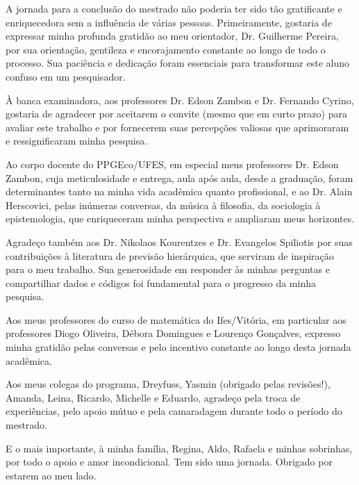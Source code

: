\begin{agradecimentos}
  A jornada para a conclusão do mestrado não poderia ter sido tão gratificante e enriquecedora sem a influência de várias pessoas. Primeiramente, gostaria de expressar minha profunda gratidão ao meu orientador, Dr. Guilherme Pereira, por sua orientação, gentileza e encorajamento constante ao longo de todo o processo. Sua paciência e dedicação foram essenciais para transformar este aluno confuso em um pesquisador.

  À banca examinadora, aos professores Dr. Edson Zambon e Dr. Fernando Cyrino, gostaria de agradecer por aceitarem o convite (mesmo que em curto prazo) para avaliar este trabalho e por fornecerem suas percepções valiosas que aprimoraram e ressignificaram minha pesquisa.

  Ao corpo docente do PPGEco/UFES, em especial meus professores Dr. Edson Zambon, cuja meticulosidade e entrega, aula após aula, desde a graduação, foram determinantes tanto na minha vida acadêmica quanto profissional, e ao Dr. Alain Herscovici, pelas inúmeras conversas, da música à filosofia, da sociologia à epistemologia, que enriqueceram minha perspectiva e ampliaram meus horizontes.

  Agradeço também aos Dr. Nikolaos Kourentzes e Dr. Evangelos Spiliotis por suas contribuições à literatura de previsão hierárquica, que serviram de inspiração para o meu trabalho. Sua generosidade em responder às minhas perguntas e compartilhar dados e códigos foi fundamental para o progresso da minha pesquisa.

  Aos meus professores do curso de matemática do Ifes/Vitória, em particular aos professores Diogo Oliveira, Débora Domingues e Lourenço Gonçalves, expresso minha gratidão pelas conversas e pelo incentivo constante ao longo desta jornada acadêmica.

  Aos meus colegas do programa, Dreyfuss, Yasmin (obrigado pelas revisões!), Amanda, Leina, Ricardo, Michelle e Eduardo, agradeço pela troca de experiências, pelo apoio mútuo e pela camaradagem durante todo o período do mestrado.

  E o mais importante, à minha família, Regina, Aldo, Rafaela e minhas sobrinhas, por todo o apoio e amor incondicional. Tem sido uma jornada. Obrigado por estarem ao meu lado.
\end{agradecimentos}


